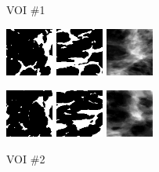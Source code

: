 \documentclass[journal]{IEEEtran}
\begin{document}
\begin{figure}[!htb]

  \centering
  \captionsetup[subfloat]{labelformat=empty}

  {\fontsize{9}{9}\selectfont VOI \#1} \vspace{1mm}

  \includegraphics[width=0.14\textwidth]
  {figure/all/dataset_3/roi_coronal}
  \includegraphics[width=0.14\textwidth]
  {figure/all/dataset_3/roi_saggital}
  \includegraphics[width=0.14\textwidth]
  {figure/all/dataset_3/proj_roi}

  \includegraphics[width=0.14\textwidth]
  {figure/all/dataset_3/model_coronal}
  \includegraphics[width=0.14\textwidth]
  {figure/all/dataset_3/model_saggital}
  \includegraphics[width=0.14\textwidth]
  {figure/all/dataset_3/proj_roi_inten10}

  {\fontsize{9}{9}\selectfont VOI \#2} \vspace{1mm}


\end{figure}
\end{document}
